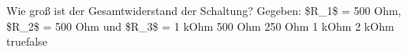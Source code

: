     {Wie groß ist der Gesamtwiderstand der Schaltung? Gegeben: \$R\_1\$ = 500 Ohm, \$R\_2\$ = 500 Ohm und \$R\_3\$ = 1 kOhm}
    {500 Ohm}
    {250 Ohm}
    {1 kOhm}
    {2 kOhm}
    {true}{false}